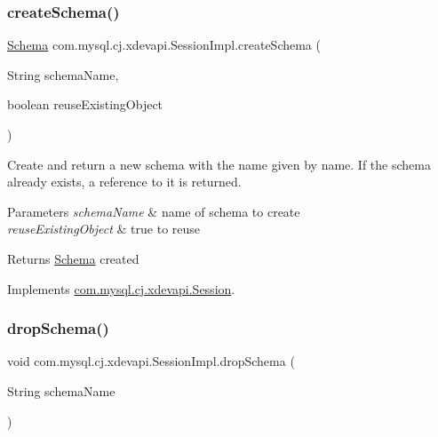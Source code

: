 \subsubsection{\texorpdfstring{create\+Schema()}{createSchema()}\hspace{0.1cm}{\footnotesize\ttfamily [2/2]}}
{\footnotesize\ttfamily \mbox{\hyperlink{interfacecom_1_1mysql_1_1cj_1_1xdevapi_1_1_schema}{Schema}} com.\+mysql.\+cj.\+xdevapi.\+Session\+Impl.\+create\+Schema (\begin{DoxyParamCaption}\item[{String}]{schema\+Name,  }\item[{boolean}]{reuse\+Existing\+Object }\end{DoxyParamCaption})}

Create and return a new schema with the name given by name. If the schema already exists, a reference to it is returned.


\begin{DoxyParams}{Parameters}
{\em schema\+Name} & name of schema to create \\
\hline
{\em reuse\+Existing\+Object} & true to reuse \\
\hline
\end{DoxyParams}
\begin{DoxyReturn}{Returns}
\mbox{\hyperlink{interfacecom_1_1mysql_1_1cj_1_1xdevapi_1_1_schema}{Schema}} created 
\end{DoxyReturn}


Implements \mbox{\hyperlink{interfacecom_1_1mysql_1_1cj_1_1xdevapi_1_1_session_aef9311823fd5a36cba753a953f3613d3}{com.\+mysql.\+cj.\+xdevapi.\+Session}}.

\mbox{\label{classcom_1_1mysql_1_1cj_1_1xdevapi_1_1_session_impl_acc48589d267536ca687a05dfb315415c}} 
\subsubsection{\texorpdfstring{drop\+Schema()}{dropSchema()}}
{\footnotesize\ttfamily void com.\+mysql.\+cj.\+xdevapi.\+Session\+Impl.\+drop\+Schema (\begin{DoxyParamCaption}\item[{String}]{schema\+Name }\end{DoxyParamCaption})}

